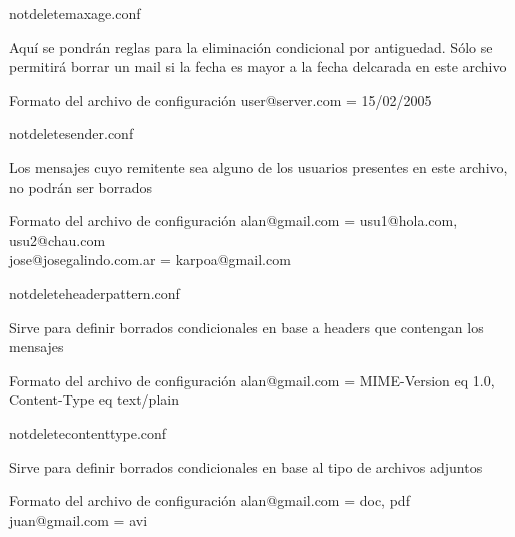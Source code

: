 \documentclass{beamer}
\begin{document}
\begin{frame}{notdelete\textunderscore maxage.conf}

\par Aquí se pondrán reglas para la eliminación condicional por antiguedad. Sólo se permitirá borrar un mail si la fecha es mayor a la fecha delcarada en este archivo\\[0.5cm]

\begin{block}{Formato del archivo de configuración}
user@server.com = 15/02/2005\\
\end{block}

\end{frame}

\begin{frame}{notdelete\textunderscore sender.conf}

\par Los mensajes cuyo remitente sea alguno de los usuarios presentes en este archivo, no podrán ser borrados\\[0.5cm]

\begin{block}{Formato del archivo de configuración}
alan@gmail.com = usu1@hola.com, usu2@chau.com\\
jose@josegalindo.com.ar = karpoa@gmail.com\\
\end{block}

\end{frame}

\begin{frame}{notdelete\textunderscore header\textunderscore pattern.conf}

\par Sirve para definir borrados condicionales en base a headers que contengan los mensajes\\[0.5cm]

\begin{block}{Formato del archivo de configuración}
alan@gmail.com = MIME-Version eq 1.0, Content-Type eq text/plain\\
\end{block}

\end{frame}

\begin{frame}{notdelete\textunderscore contenttype.conf}

\par Sirve para definir borrados condicionales en base al tipo de archivos adjuntos\\[0.5cm]

\begin{block}{Formato del archivo de configuración}
alan@gmail.com = doc, pdf\\
juan@gmail.com = avi\\
\end{block}

\end{frame}
\end{document}
